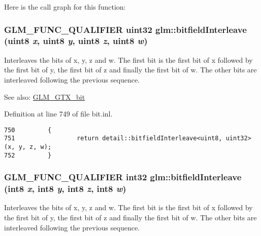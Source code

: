 Here is the call graph for this function:\hypertarget{group__gtx__bit_g447c0bbed9d60c14578626d8f03f3755}{
\subsubsection[bitfieldInterleave]{\setlength{\rightskip}{0pt plus 5cm}GLM\_\-FUNC\_\-QUALIFIER uint32 glm::bitfieldInterleave (uint8 {\em x}, \/  uint8 {\em y}, \/  uint8 {\em z}, \/  uint8 {\em w})}}
\label{group__gtx__bit_g447c0bbed9d60c14578626d8f03f3755}


Interleaves the bits of x, y, z and w. The first bit is the first bit of x followed by the first bit of y, the first bit of z and finally the first bit of w. The other bits are interleaved following the previous sequence.

\begin{Desc}
\item[See also:]\hyperlink{group__gtx__bit}{GLM\_\-GTX\_\-bit} \end{Desc}


Definition at line 749 of file bit.inl.

\begin{Code}\begin{verbatim}750         {
751                 return detail::bitfieldInterleave<uint8, uint32>(x, y, z, w);
752         }
\end{verbatim}
\end{Code}


\hypertarget{group__gtx__bit_g7da84ecc2b3a46c9c08a9f40012359cf}{
\subsubsection[bitfieldInterleave]{\setlength{\rightskip}{0pt plus 5cm}GLM\_\-FUNC\_\-QUALIFIER int32 glm::bitfieldInterleave (int8 {\em x}, \/  int8 {\em y}, \/  int8 {\em z}, \/  int8 {\em w})}}
\label{group__gtx__bit_g7da84ecc2b3a46c9c08a9f40012359cf}


Interleaves the bits of x, y, z and w. The first bit is the first bit of x followed by the first bit of y, the first bit of z and finally the first bit of w. The other bits are interleaved following the previous sequence.


